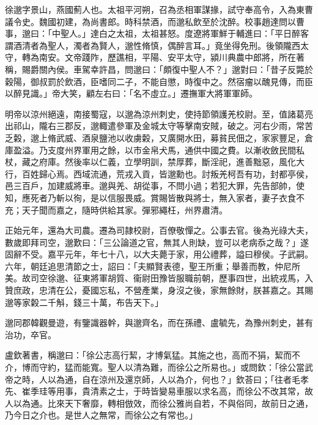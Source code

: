 \begin{pinyinscope}
 
 
 徐邈字景山，燕國薊人也。太祖平河朔，召為丞相軍謀掾，試守奉高令，入為東曹議令史。魏國初建，為尚書郎。時科禁酒，而邈私飲至於沈醉。校事趙達問以曹事，邈曰：「中聖人。」達白之太祖，太祖甚怒。度遼將軍鮮于輔進曰：「平日醉客謂酒清者為聖人，濁者為賢人，邈性脩慎，偶醉言耳。」竟坐得免刑。後領隴西太守，轉為南安。文帝踐阼，歷譙相，平陽、安平太守，潁川典農中郎將，所在著稱，賜爵關內侯。車駕幸許昌，問邈曰：「頗復中聖人不？」邈對曰：「昔子反斃於穀陽，御叔罰於飲酒，臣嗜同二子，不能自懲，時復中之。然宿瘤以醜見傳，而臣以醉見識。」帝大笑，顧左右曰：「名不虛立。」遷撫軍大將軍軍師。
 
 
 
 
 明帝以涼州絕遠，南接蜀寇，以邈為涼州刺史，使持節領護羌校尉。至，值諸葛亮出祁山，隴右三郡反，邈輙遣參軍及金城太守等擊南安賊，破之。河右少雨，常苦乏糓，邈上脩武威、酒泉鹽池以收虜糓，又廣開水田，募貧民佃之，家家豐足，倉庫盈溢。乃支度州界軍用之餘，以市金帛犬馬，通供中國之費。以漸收斂民間私杖，藏之府庫。然後率以仁義，立學明訓，禁厚葬，斷淫祀，進善黜惡，風化大行，百姓歸心焉。西域流通，荒戎入貢，皆邈勳也。討叛羌柯吾有功，封都亭侯，邑三百戶，加建威將車。邈與羌、胡從事，不問小過；若犯大罪，先告部帥，使知，應死者乃斬以徇，是以信服畏威。賞賜皆散與將士，無入家者，妻子衣食不充；天子聞而嘉之，隨時供給其家。彈邪繩枉，州界肅清。
 
 
 
 
 正始元年，還為大司農。遷為司隷校尉，百僚敬憚之。公事去官。後為光祿大夫，數歲即拜司空，邈歎曰：「三公論道之官，無其人則缺，豈可以老病忝之哉？」遂固辭不受。嘉平元年，年七十八，以大夫薨于家，用公禮葬，謚曰穆侯。子武嗣。六年，朝廷追思清節之士，詔曰：「夫顯賢表德，聖王所重；舉善而教，仲尼所美。故司空徐邈、征東將軍胡質、衞尉田豫皆服職前朝，歷事四世，出統戎馬，入贊庶政，忠清在公，憂國忘私，不營產業，身沒之後，家無餘財，朕甚嘉之。其賜邈等家糓二千斛，錢三十萬，布告天下。」
 
 
 
 
 邈同郡韓觀曼遊，有鑒識器幹，與邈齊名，而在孫禮、盧毓先，為豫州刺史，甚有治功，卒官。
 
 
 盧欽著書，稱邈曰：「徐公志高行絜，才博氣猛。其施之也，高而不狷，絜而不介，博而守約，猛而能寬。聖人以清為難，而徐公之所易也。」或問欽：「徐公當武帝之時，人以為通，自在涼州及還京師，人以為介，何也？」欽荅曰；「往者毛孝先、崔季珪等用事，貴清素之士，于時皆變易車服以求名高，而徐公不改其常，故人以為通。比來天下奢靡，轉相倣效，而徐公雅尚自若，不與俗同，故前日之通，乃今日之介也。是世人之無常，而徐公之有常也。」
 
 
\end{pinyinscope}